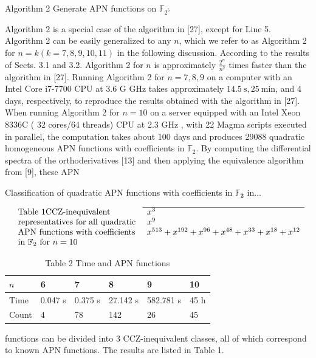 \documentclass[10pt]{article}
\begin{document}
Algorithm 2 Generate APN functions on $\mathbb{F}_{2^{5}}$

Algorithm 2 is a special case of the algorithm in [27], except for Line 5. Algorithm 2 can be easily generalized to any $n$, which we refer to as Algorithm 2 for $n=k(k=7,8,9,10,11)$ in the following discussion. According to the results of Sects. 3.1 and 3.2. Algorithm 2 for $n$ is approximately $\frac{2^{n}}{n^{2}}$ times faster than the algorithm in [27]. Running Algorithm 2 for $n=7,8,9$ on a computer with an Intel Core i7-7700 CPU at 3.6 G GHz takes approximately $14.5 \mathrm{~s}, 25 \mathrm{~min}$, and 4 days, respectively, to reproduce the results obtained with the algorithm in [27]. When running Algorithm 2 for $n=10$ on a server equipped with an Intel Xeon 8336C ( 32 cores/64 threads) CPU at 2.3 GHz , with 22 Magma scripts executed in parallel, the computation takes about 100 days and produces 29088 quadratic homogeneous APN functions with coefficients in $\mathbb{F}_{2}$. By computing the differential spectra of the orthoderivatives [13] and then applying the equivalence algorithm from [9], these APN

Classification of quadratic APN functions with coefficients in $\mathbb{F}_{\mathbf{2}}$ in...

$$
\begin{array}{ll}
\cline { 2 - 2 } \text { Table } 1 \mathrm{CCZ} \text {-inequivalent } & x^{3} \\
\text { representatives for all quadratic } & x^{9} \\
\text { APN functions with coefficients } & x^{513}+x^{192}+x^{96}+x^{48}+x^{33}+x^{18}+x^{12} \\
\text { in } \mathbb{F}_{2} \text { for } n=10 &
\end{array}
$$

\begin{table}[h]
\begin{center}
\captionsetup{labelformat=empty}
\caption{Table 2 Time and APN functions}
\begin{tabular}{llllll}
\hline
$n$ & 6 & 7 & 8 & 9 & 10 \\
\hline
Time & 0.047 s & 0.375 s & 27.142 s & 582.781 s & 45 h \\
Count & 4 & 78 & 142 & 26 & 45 \\
\hline
\end{tabular}
\end{center}
\end{table}

functions can be divided into 3 CCZ-inequivalent classes, all of which correspond to known APN functions. The results are listed in Table 1.
\end{document}
